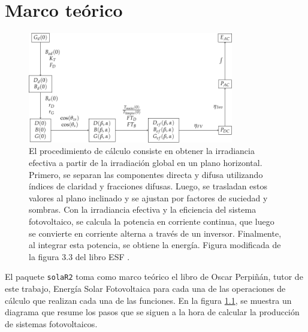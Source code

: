 \chapter{Marco teórico}
\label{chap:marco-teorico}
\begin{figure}[H]
\centering
\includegraphics[width=0.8\textwidth]{figuras/ProcedimientoCalculoRadiacionInclinada.pdf}
\caption{\label{fig:orge9b78b1}El procedimiento de cálculo consiste en obtener la irradiancia efectiva a partir de la irradiación global en un plano horizontal. Primero, se separan las componentes directa y difusa utilizando índices de claridad y fracciones difusas. Luego, se trasladan estos valores al plano inclinado y se ajustan por factores de suciedad y sombras. Con la irradiancia efectiva y la eficiencia del sistema fotovoltaico, se calcula la potencia en corriente continua, que luego se convierte en corriente alterna a través de un inversor. Finalmente, al integrar esta potencia, se obtiene la energía. Figura modificada de la figura 3.3 del libro ESF \cite{Perpinan2023}.}
\end{figure}


El paquete \texttt{solaR2} toma como marco teórico el libro de Oscar Perpiñán, tutor de este trabajo, Energía Solar Fotovoltaica \cite{Perpinan2023} para cada una de las operaciones de cálculo que realizan cada una de las funciones.
En la figura \ref{fig:orge9b78b1}, se muestra un diagrama que resume los pasos que se siguen a la hora de calcular la producción de sistemas fotovoltaicos.

\FloatBarrier

